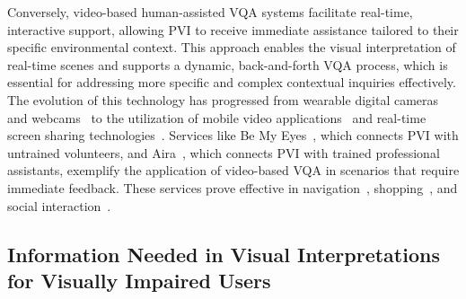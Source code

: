 Conversely, video-based human-assisted VQA systems facilitate real-time, interactive support, allowing PVI to receive immediate assistance tailored to their specific environmental context. This approach enables the visual interpretation of real-time scenes and supports a dynamic, back-and-forth VQA process, which is essential for addressing more specific and complex contextual inquiries effectively.
The evolution of this technology has progressed from wearable digital cameras ~\cite{hunaiti2006remote,garaj2003system,baranski2015field} and webcams~\cite{bujacz2008remote,scheggi2014remote,chaudary2017tele} to the utilization of mobile video applications~\cite{holmes2015iphone, BeMyEyes2020, Aira2020,xie2022dis,xie2024bubblecam} and real-time screen sharing technologies~\cite{lasecki2011real,lasecki2013answering,xie2023two}. 
% 
Services like Be My Eyes~\cite{BeMyEyes2020}, which connects PVI with untrained volunteers, and Aira~\cite{Aira2020}, which connects PVI with trained professional assistants, exemplify the application of video-based VQA in scenarios that require immediate feedback. These services prove effective in navigation~\cite{kamikubo2020support,xie2022dis,c4vtochi,iui,yu2024human}, 
shopping~\cite{c4vtochi,xie2023two,iui}, 
and social interaction~\cite{lee2020emerging,Caroll2020Human,lee2018conversations}. 





\subsection{Information Needed in Visual Interpretations for Visually Impaired Users}


